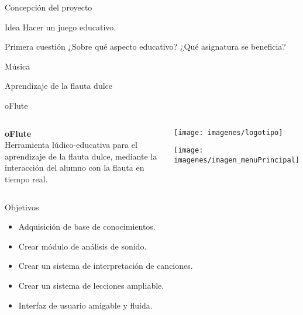 \documentclass[11pt,xcolor=svgnames]{beamer}
\begin{document}
\begin{frame}{Concepción del proyecto}
  \begin{block}{Idea}
    Hacer un juego educativo.
  \end{block}

  \pause

  \begin{block}{Primera cuestión}
    ¿Sobre qué aspecto educativo? ¿Qué asignatura se beneficia?
  \end{block}

  \vspace{0.5cm}
  \pause

  \begin{center}
    \LARGE Música \\[0.5cm]

    \pause

    \LARGE Aprendizaje de la flauta dulce
  \end{center}
\end{frame}
{

\begin{frame}{oFlute}
  \begin{columns}

    \begin{block}{}
      \begin{center}
        \textbf{oFlute}\\
        Herramienta lúdico-educativa para el aprendizaje de la flauta dulce, 
        mediante la interacción del alumno con la flauta en tiempo real.
      \end{center}
    \end{block}

    \begin{block}{}
      \begin{center}
        \vspace{-1.5cm}
        \texttt{[image: imagenes/logotipo]}

        \bigskip
        \bigskip

        \texttt{[image: imagenes/imagen\_menuPrincipal]}
      \end{center}
    \end{block}   
  \end{columns}
\end{frame}
}

\begin{frame}{Objetivos}
  \Large
  \begin{itemize}
  \item Adquisición de base de conocimientos. \pause
  \item Crear módulo de análisis de sonido. \pause
  \item Crear un sistema de interpretación de canciones. \pause
  \item Crear un sistema de lecciones ampliable. \pause
  \item Interfaz de usuario amigable y fluida.
  \end{itemize}
\end{frame}
\end{document}
